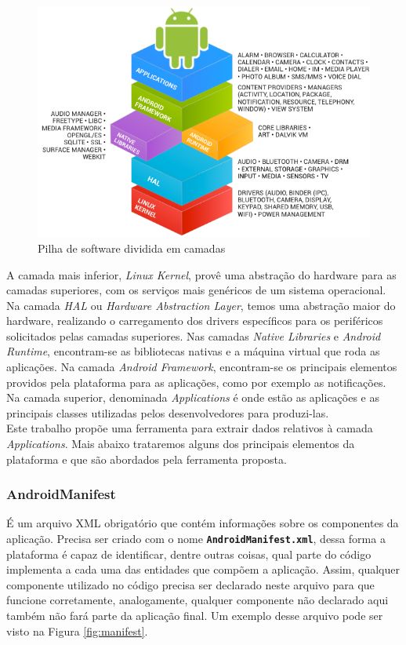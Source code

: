 \documentclass[a4paper,12pt]{article}
\begin{document}
\begin{figure}[h]
\centering
\includegraphics[width=0.8\linewidth]{imgs/android_framework_details.png}
\caption{Pilha de software dividida em camadas \cite{androidSource}}
\label{fig:androidStack}
\end{figure}


A camada mais inferior, \textit{Linux Kernel}, provê uma abstração do hardware para as camadas superiores, com os serviços mais genéricos de um sistema operacional. Na camada \textit{HAL} ou \textit{Hardware Abstraction Layer}, temos uma abstração maior do hardware, realizando o carregamento dos drivers específicos para os periféricos solicitados pelas camadas superiores. Nas camadas \textit{Native Libraries} e \textit{Android Runtime}, encontram-se as bibliotecas nativas e a máquina virtual que roda as aplicações. Na camada \textit{Android Framework}, encontram-se os principais elementos providos pela plataforma para as aplicações, como por exemplo as notificações. Na camada superior, denominada \textit{Applications} é onde estão as aplicações e as principais classes utilizadas pelos desenvolvedores para produzi-las. \\

Este trabalho propõe uma ferramenta para extrair dados relativos à camada \textit{Applications}. Mais abaixo trataremos alguns dos principais elementos da plataforma e que são abordados pela ferramenta proposta.


\subsubsection{AndroidManifest}
É um arquivo XML obrigatório que contém informações sobre os componentes da aplicação. Precisa ser criado com o nome {\small\texttt{\textbf{AndroidManifest.xml}}}, dessa forma a plataforma é capaz de identificar, dentre outras coisas, qual parte do código implementa a cada uma das entidades que compõem a aplicação. Assim, qualquer componente utilizado no código precisa ser declarado neste arquivo para que funcione corretamente, analogamente, qualquer componente não declarado aqui também não fará parte da aplicação final. Um exemplo desse arquivo pode ser visto na Figura \ref{fig:manifest}.
\end{document}
